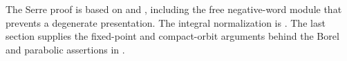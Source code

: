 The Serre proof is based on
\cite[Sections 18--19]{humphreys} and
\cite[Section 24]{etingof}, including the free negative-word
module that prevents a degenerate presentation.
The integral normalization is
\cite[Section 25]{humphreys}. The last section supplies the
fixed-point and compact-orbit arguments behind the Borel
and parabolic assertions in \cite[Sections 51.3--51.5]{etingof}.
